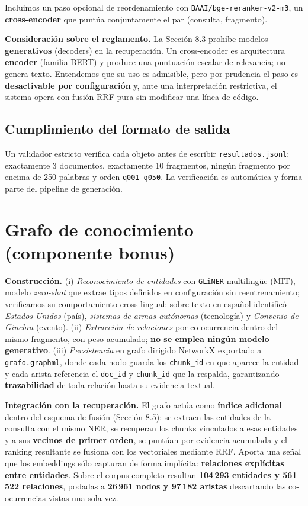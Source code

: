 \documentclass[10pt,a4paper]{article}
\begin{document}
Incluimos un paso opcional de reordenamiento con \texttt{BAAI/bge-reranker-v2-m3}, un
\textbf{cross-encoder} que puntúa conjuntamente el par (consulta, fragmento).

\textbf{Consideración sobre el reglamento.} La Sección 8.3 prohíbe modelos \textbf{generativos}
(decoders) en la recuperación. Un cross-encoder es arquitectura \textbf{encoder} (familia BERT) y
produce una puntuación escalar de relevancia; no genera texto. Entendemos que su uso es admisible,
pero por prudencia el paso es \textbf{desactivable por configuración} y, ante una interpretación
restrictiva, el sistema opera con fusión RRF pura sin modificar una línea de código.

\subsection{Cumplimiento del formato de salida}

Un validador estricto verifica cada objeto antes de escribir \texttt{resultados.jsonl}: exactamente
3 documentos, exactamente 10 fragmentos, ningún fragmento por encima de 250 palabras y orden
\texttt{q001}–\texttt{q050}. La verificación es automática y forma parte del pipeline de generación.

\section{Grafo de conocimiento (componente bonus)}

\textbf{Construcción.} (i) \emph{Reconocimiento de entidades} con \texttt{GLiNER} multilingüe
(MIT), modelo \emph{zero-shot} que extrae tipos definidos en configuración sin reentrenamiento;
verificamos su comportamiento cross-lingual: sobre texto en español identificó \emph{Estados
Unidos} (país), \emph{sistemas de armas autónomas} (tecnología) y \emph{Convenio de Ginebra}
(evento). (ii) \emph{Extracción de relaciones} por co-ocurrencia dentro del mismo fragmento, con
peso acumulado; \textbf{no se emplea ningún modelo generativo}. (iii) \emph{Persistencia} en grafo
dirigido NetworkX exportado a \texttt{grafo.graphml}, donde cada nodo guarda los \texttt{chunk\_id}
en que aparece la entidad y cada arista referencia el \texttt{doc\_id} y \texttt{chunk\_id} que la
respalda, garantizando \textbf{trazabilidad} de toda relación hasta su evidencia textual.

\textbf{Integración con la recuperación.} El grafo actúa como \textbf{índice adicional} dentro del
esquema de fusión (Sección 8.5): se extraen las entidades de la consulta con el mismo NER, se
recuperan los chunks vinculados a esas entidades y a sus \textbf{vecinos de primer orden}, se
puntúan por evidencia acumulada y el ranking resultante se fusiona con los vectoriales mediante
RRF. Aporta una señal que los embeddings sólo capturan de forma implícita: \textbf{relaciones
explícitas entre entidades}. Sobre el corpus completo resultan \textbf{104\,293 entidades y
561\,522 relaciones}, podadas a \textbf{26\,961 nodos y 97\,182 aristas} descartando las
co-ocurrencias vistas una sola vez.
\end{document}
